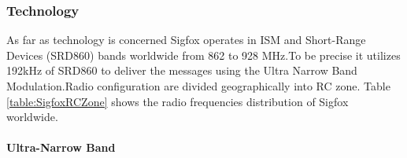 \documentclass[12pt]{article}
\begin{document}
\subsubsection{Technology}
As far as technology is concerned Sigfox operates in ISM and Short-Range Devices (SRD860) bands worldwide from 862 to 928 MHz.To be precise it utilizes 192kHz of SRD860 to deliver the messages using the Ultra Narrow Band Modulation.Radio configuration are divided geographically into RC zone. Table \ref{table:SigfoxRCZone} shows the radio frequencies distribution of Sigfox worldwide.

\begin{table}[H]
\caption{Radio Frequency distribution of Sigfox worldwide \cite{SigfoxRCZone}}

\label{table:SigfoxRCZone}
\end{table}
\newpage
\paragraph{Ultra-Narrow Band}
\end{document}
